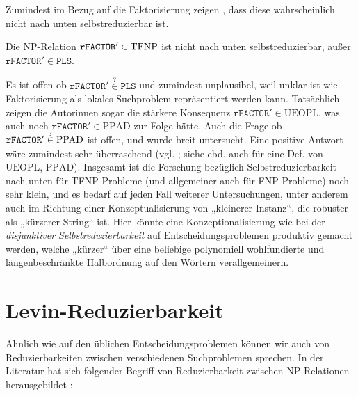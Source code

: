 Zumindest im Bezug auf die Faktorisierung zeigen \citeauthor{harsha_downward_2023}, dass diese wahrscheinlich nicht nach unten selbstreduzierbar ist.
\begin{theorem}
    Die NP-Relation $\mathtt{rFACTOR}'\in\mathrm{TFNP}$ ist nicht nach unten selbstreduzierbar, außer $\mathtt{rFACTOR}'\in\mathtt{PLS}$.
\end{theorem}
Es ist offen ob $\mathtt{rFACTOR}'\stackrel{?}{\in}\mathtt{PLS}$ und zumindest unplausibel, weil unklar ist wie Faktorisierung als lokales Suchproblem repräsentiert werden kann.
Tatsächlich zeigen die Autorinnen sogar die stärkere Konsequenz $\mathtt{rFACTOR}'\in\mathrm{UEOPL}$, was auch noch $\mathtt{rFACTOR}'\in\mathrm{PPAD}$ zur Folge hätte. Auch die Frage ob $\mathtt{rFACTOR}'\stackrel{\smash ?}{\in}\mathrm{PPAD}$ ist offen, und wurde breit untersucht. Eine positive Antwort wäre zumindest sehr überraschend (vgl. \cite[67:15]{harsha_downward_2023}; siehe ebd. auch für eine Def. von $\mathrm{UEOPL}$, $\mathrm{PPAD}$).
Insgesamt ist die Forschung bezüglich Selbstreduzierbarkeit nach unten für TFNP-Probleme (und allgemeiner auch für FNP-Probleme) noch sehr klein, und es bedarf auf jeden Fall weiterer Untersuchungen, unter anderem auch im Richtung einer Konzeptualisierung von „kleinerer Instanz“, die robuster als „kürzerer String“ ist. Hier könnte eine Konzeptionalisierung wie bei der \emph{disjunktiver Selbstreduzierbarkeit} auf Entscheidungsproblemen \parencites(vgl.)(){meyer_frequency_1979}{balcazar_self_1989}{selman_natural_1988}[Abschn. 9.5]{wechsung_vorlesungen_2000} produktiv gemacht werden, welche „kürzer“ über eine beliebige polynomiell wohlfundierte und längenbeschränkte Halbordnung auf den Wörtern verallgemeinern.

\section{Levin-Reduzierbarkeit}\label{sec:levin}

Ähnlich wie auf den üblichen Entscheidungsproblemen können wir auch von Reduzierbarkeiten zwischen verschiedenen Suchproblemen sprechen. In der Literatur hat sich folgender Begriff von Reduzierbarkeit zwischen NP-Relationen herausgebildet \parencites(vgl.)()[229]{papadimitriou_computational_1994}[61]{goldreich_computational_2008}[50]{arora_computational_2009}:

